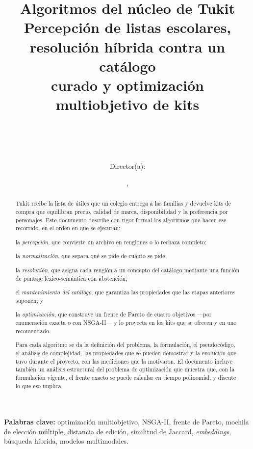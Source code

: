 \documentclass[11pt,letterpaper]{article}
\title{%
  \textbf{Algoritmos del núcleo de Tukit}\\[0.4em]
  \large Percepción de listas escolares, resolución híbrida contra un catálogo\\
  curado y optimización multiobjetivo de kits}
\author{\Autor\\[0.3em]
  \small \Universidad\\
  \small \Facultad\ \textperiodcentered\ \Departamento\\
  \small \Programa\\[0.3em]
  \small Director(a): \Director}
\date{\Lugar, \Fecha}
\begin{document}
\maketitle
\thispagestyle{empty}

\begin{abstract}
\noindent
Tukit recibe la lista de útiles que un colegio entrega a las familias y devuelve
kits de compra que equilibran precio, calidad de marca, disponibilidad y la
preferencia por personajes. Este documento describe con rigor formal los
algoritmos que hacen ese recorrido, en el orden en que se ejecutan:
\begin{enumerate*}[label=(\roman*)]
  \item la \emph{percepción}, que convierte un archivo en renglones o lo rechaza
        completo;
  \item la \emph{normalización}, que separa qué se pide de cuánto se pide;
  \item la \emph{resolución}, que asigna cada renglón a un concepto del
        catálogo mediante una función de puntaje léxico-semántica con abstención;
  \item el \emph{mantenimiento del catálogo}, que garantiza las propiedades que
        las etapas anteriores suponen; y
  \item la \emph{optimización}, que construye un frente de Pareto de cuatro
        objetivos ---por enumeración exacta o con NSGA-II--- y lo proyecta en
        los kits que se ofrecen y en uno recomendado.
\end{enumerate*}
Para cada algoritmo se da la definición del problema, la formulación, el
pseudocódigo, el análisis de complejidad, las propiedades que se pueden
demostrar y la evolución que tuvo durante el proyecto, con las mediciones que la
motivaron. El documento incluye también un análisis estructural del problema
de optimización que muestra que, con la formulación vigente, el frente exacto
se puede calcular en tiempo polinomial, y discute lo que eso implica.
\end{abstract}

\vspace{1em}
\noindent\textbf{Palabras clave:} optimización multiobjetivo, NSGA-II, frente
de Pareto, mochila de elección múltiple, distancia de edición, similitud de
Jaccard, \emph{embeddings}, búsqueda híbrida, modelos multimodales.

\clearpage
\tableofcontents
\clearpage












\appendix




\end{document}
